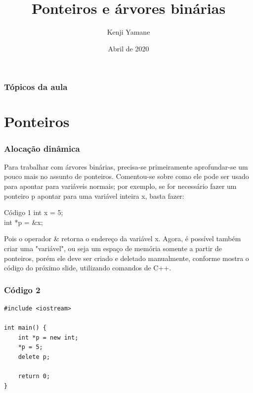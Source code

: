 \documentclass{beamer}
\title[Apresentação]{Ponteiros e árvores binárias}
\author[\textit{Kenji Yamane}]{Kenji Yamane}
\date{Abril de 2020}
\begin{document}
\begin{frame}

\titlepage


\end{frame}

\begin{frame}

\frametitle{Tópicos da aula}

\tableofcontents

\end{frame}

\section{Ponteiros}
	
	\begin{frame}
	\frametitle{Alocação dinâmica}
		Para trabalhar com árvores binárias, precisa-se
		primeiramente aprofundar-se um pouco mais no assunto de
		ponteiros. Comentou-se sobre como ele pode ser usado para
		apontar para variáveis normais; por exemplo, se for necessário
		fazer um ponteiro p apontar para uma variável inteira x, basta
		fazer:
		\begin{block}{Código 1}
		\hspace{10 pt} int x = 5;\\
		\hspace{10 pt} int *p = \&x;
		\end{block}
		Pois o operador \& retorna o endereço da variável x. Agora,
		é possível também criar uma "variável", ou seja um espaço de
		memória somente a partir de ponteiros, porém ele deve ser
		criado e deletado manualmente, conforme mostra o código do
		próximo slide, utilizando comandos de C++.
	\end{frame}

	\begin{frame}[fragile]
	\frametitle{Código 2}
		\begin{lstlisting}
#include <iostream>

int main() {
    int *p = new int;
    *p = 5;
    delete p;

    return 0;
}
		\end{lstlisting}
	\end{frame}
\end{document}
